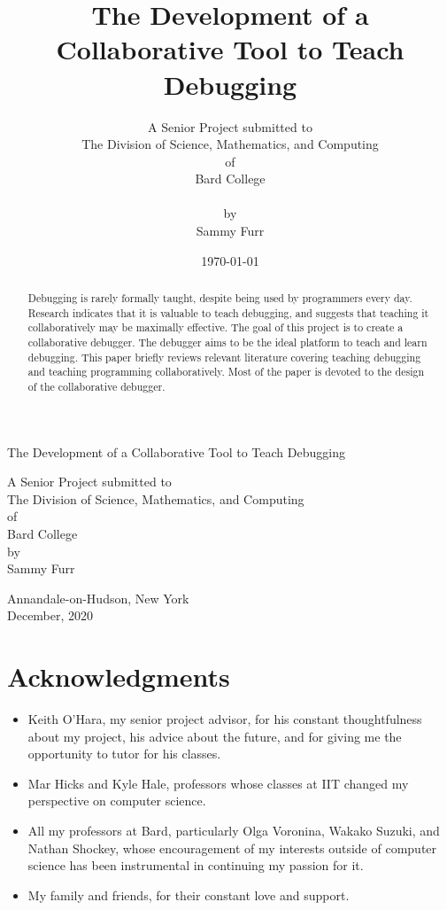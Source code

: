 \documentclass[12pt]{article}
\author{A Senior Project submitted to\\The Division of Science, Mathematics, and Computing\\of\\Bard College\\\\by\\Sammy Furr}
\title{The Development of a Collaborative Tool to Teach Debugging}
\date{\today}
\begin{document}
\begin{titlepage}
  \linespread{1}
    \begin{center}
            
        \Huge
        The Development of a Collaborative Tool to Teach Debugging
        
        \vspace{4cm}
       
        \large
        A Senior Project submitted to\\
        The Division of Science, Mathematics, and Computing\\
        of\\
        Bard College\\
        \vspace{1cm}
        by\\
        Sammy Furr
        \vfill
            
        Annandale-on-Hudson, New York\\
        December, 2020
    \end{center}
\end{titlepage}

\begin{abstract}
  \linespread{1} Debugging is rarely formally taught, despite being
  used by programmers every day.  Research indicates that it is
  valuable to teach debugging, and suggests that teaching it
  collaboratively may be maximally effective.  The goal of this
  project is to create a collaborative debugger.  The debugger aims to
  be the ideal platform to teach and learn debugging.  This paper
  briefly reviews relevant literature covering teaching debugging and
  teaching programming collaboratively.  Most of the paper is devoted
  to the design of the collaborative debugger.
\end{abstract}

\section{Acknowledgments}

\begin{itemize}
\item Keith O'Hara, my senior project advisor, for his constant
  thoughtfulness about my project, his advice about the future, and
  for giving me the opportunity to tutor for his classes.
\item Mar Hicks and Kyle Hale, professors whose classes at IIT changed
  my perspective on computer science.
\item All my professors at Bard, particularly Olga Voronina, Wakako
  Suzuki, and Nathan Shockey, whose encouragement of my interests
  outside of computer science has been instrumental in continuing my
  passion for it.
\item My family and friends, for their constant love and support.
\end{itemize}
\end{document}
